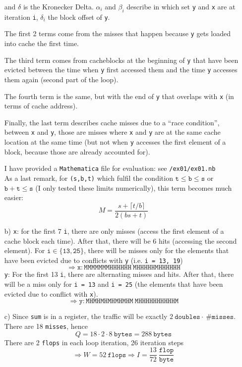 \documentclass[11pt]{article}
\newcommand{\type}{~\mathtt}
\begin{document}
\begin{itemize}
		and $\delta$ is the Kronecker Delta. $\alpha_i$ and $\beta_i$ describe in which set \texttt{y} and \texttt{x} are at iteration \texttt{i}, $\delta_i$ the block offset of \texttt{y}.\par The first 2 terms come from the misses that happen because \texttt{y} gets loaded into cache the first time.\par The third term comes from cacheblocks at the beginning of \texttt{y} that have been evicted between the time when \texttt{y} first accessed them and the time \texttt{y} accesses them again (second part of the loop).\par The fourth term is the same, but with the end of \texttt{y} that overlaps with \texttt{x} (in terms of cache address).\par Finally, the last term describes cache misses due to a ``race condition'', between \texttt{x} and \texttt{y}, those are misses where \texttt{x} and \texttt{y} are at the same cache location at the same time (but not when \texttt{y} accesses the first element of a block, because those are already accounted for).\par
		I have provided a \texttt{Mathematica} file for evaluation: see \texttt{/ex01/ex01.nb}\\
		As a last remark, for \texttt{(s,b,t)} which fulfil the condition $\mathtt{t\leq b\leq s}$ or $\mathtt{b + t \leq s}$ (I only tested these limits numerically), this term becomes much easier:
		\[ M = \frac{s + \lceil t/b\rceil  }{2(bs + t)} \]
		
		\item[b)] \texttt{x}: for the first 7 \texttt{i}, there are only misses (access the first element of a cache block each time). After that, there will be 6 hits (accessing the second element). For $\mathtt{i \in \{13, 25\}}$, there will be misses only for the elements that have been evicted due to conflicts with \texttt{y} (i.e. \texttt{i = 13, 19})
		\[ \Rightarrow \mathtt{x: MMMMMMMHHHHHH~MHHHHHMHHHHHH} \]
		\texttt{y}: For the first 13 \texttt{i}, there are alternating misses and hits. After that, there will be a miss only for \texttt{i = 13} and \texttt{i = 25} (the elements that have been evicted due to conflict with \texttt{x}).
		\[ \Rightarrow \mathtt{y: MHMHMHMHMHMHM~MHHHHHHHHHHM} \]
		\item[c)] Since \texttt{sum} is in a register, the traffic will be exactly $2 \type{doubles} \cdot \type{\# misses}$. There are 18 \texttt{misses}, hence 
		\[ Q = 18 \cdot 2 \cdot 8 \type{bytes} = 288 \type{bytes} \]
		There are 2 \texttt{flops} in each loop iteration, 26 iteration steps 
		\[ \Rightarrow W = 52 \type{flops} \Rightarrow I = \frac{13}{72}\type{\frac{flop}{byte}} \]
	\end{itemize}
	\newpage
\end{document}
